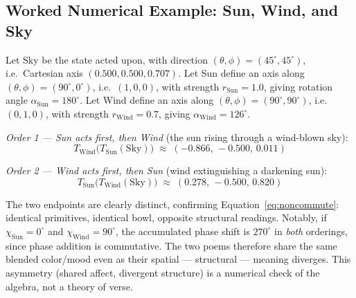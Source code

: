 \documentclass[12pt, a4paper]{article}
\begin{document}
\subsection{Worked Numerical Example: Sun, Wind, and Sky}
\label{subsec:transform_example}
Let Sky be the state acted upon, with direction
$(\theta,\phi) = (45^\circ, 45^\circ)$, i.e.\ Cartesian axis
$(0.500, 0.500, 0.707)$. Let Sun define an axis along
$(\theta,\phi) = (90^\circ, 0^\circ)$, i.e.\ $(1,0,0)$, with strength
$r_{\text{Sun}} = 1.0$, giving rotation angle $\alpha_{\text{Sun}} =
180^\circ$. Let Wind define an axis along $(\theta,\phi) = (90^\circ,
90^\circ)$, i.e.\ $(0,1,0)$, with strength $r_{\text{Wind}} = 0.7$,
giving $\alpha_{\text{Wind}} = 126^\circ$.

\emph{Order 1 --- Sun acts first, then Wind} (the sun rising through a
wind-blown sky):
\begin{equation}
    T_{\text{Wind}}\big(T_{\text{Sun}}(\text{Sky})\big) \;\approx\; (-0.866,\, -0.500,\, 0.011)
\end{equation}

\emph{Order 2 --- Wind acts first, then Sun} (wind extinguishing a
darkening sun):
\begin{equation}
    T_{\text{Sun}}\big(T_{\text{Wind}}(\text{Sky})\big) \;\approx\; (0.278,\, -0.500,\, 0.820)
\end{equation}

The two endpoints are clearly distinct, confirming
Equation~\eqref{eq:noncommute}: identical primitives, identical
bowl, opposite structural readings. Notably, if $\chi_{\text{Sun}}
= 0^\circ$ and $\chi_{\text{Wind}} = 90^\circ$, the accumulated phase
shift is $270^\circ$ in \emph{both} orderings, since phase addition is
commutative. The two poems therefore share the same blended color/mood
even as their spatial --- structural --- meaning diverges. This
asymmetry (shared affect, divergent structure) is a numerical check of
the algebra, not a theory of verse.
\end{document}
